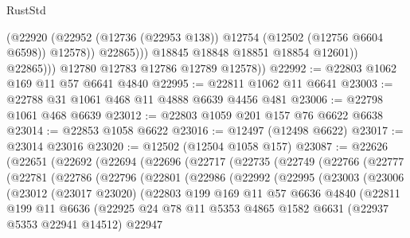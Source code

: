 \begin{lexlean}{RustStd}
\begin{coremodule}
                        (@22920
                          (@22952
                            (@12736 (@22953 @138))
                            @12754
                            (@12502 (@12756 @6604 @6598))
                            @12578))
                        @22865)))
                  @18845
                  @18848
                  @18851
                  @18854
                  @12601))
              @22865)))
        @12780
        @12783
        @12786
        @12789
        @12578))
@22992 := @22803 @1062 @169 @11 @57 @6641 @4840
@22995 := @22811 @1062 @11 @6641
@23003 := @22788 @31 @1061 @468 @11 @4888 @6639 @4456 @481
@23006 := @22798 @1061 @468 @6639
@23012 := @22803 @1059 @201 @157 @76 @6622 @6638
@23014 := @22853 @1058 @6622
@23016 := @12497 (@12498 @6622)
@23017 := @23014 @23016
@23020 := @12502 (@12504 @1058 @157)
@23087 := @22626
    (@22651
      (@22692
        (@22694
          (@22696
            (@22717
              (@22735
                (@22749
                  (@22766
                    (@22777
                      (@22781
                        (@22786
                          (@22796
                            (@22801
                              (@22986
                                (@22992
                                  (@22995
                                    (@23003
                                      (@23006
                                        (@23012
                                          (@23017 @23020)
                                          (@22803
                                            @199
                                            @169
                                            @11
                                            @57
                                            @6636
                                            @4840
                                            (@22811
                                              @199
                                              @11
                                              @6636
                                              (@22925
                                                @24
                                                @78
                                                @11
                                                @5353
                                                @4865
                                                @1582
                                                @6631
                                                (@22937 @5353 @22941 @14512)
                                                @22947

\end{coremodule}
\end{lexlean}
